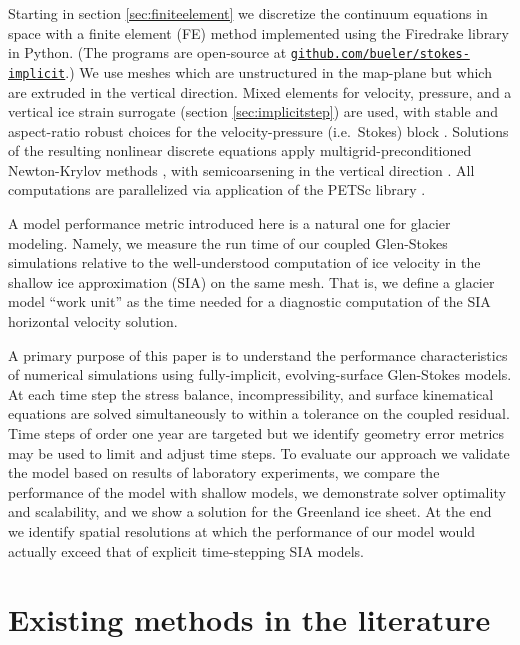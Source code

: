 \documentclass[letterpaper,final,12pt,reqno]{amsart}
\begin{document}
Starting in section \ref{sec:finiteelement} we discretize the continuum equations in space with a finite element (FE) method \cite{Elmanetal2014} implemented using the Firedrake library \cite{Rathgeberetal2016} in Python.  (The programs are open-source at \href{https://github.com/bueler/stokes-implicit}{\texttt{github.com/bueler/stokes-implicit}}.)  We use meshes which are unstructured in the map-plane but which are extruded \cite{Bercea2016,Gibsonetal2019,McRaeetal2016} in the vertical direction.  Mixed elements for velocity, pressure, and a vertical ice strain surrogate (section \ref{sec:implicitstep}) are used, with stable and aspect-ratio robust choices for the velocity-pressure (i.e.~Stokes) block \cite{Elmanetal2014}.  Solutions of the resulting nonlinear discrete equations apply multigrid-preconditioned Newton-Krylov methods \cite{Bueler2021}, with semicoarsening in the vertical direction \cite{Tuminaroetal2016}.  All computations are parallelized via application of the PETSc library \cite{Balayetal2020}.

A model performance metric introduced here is a natural one for glacier modeling.  Namely, we measure the run time of our coupled Glen-Stokes simulations relative to the well-understood computation of ice velocity in the shallow ice approximation (SIA) \cite{Fowler1997} on the same mesh.  That is, we define a glacier model ``work unit'' as the time needed for a diagnostic computation of the SIA horizontal velocity solution.

A primary purpose of this paper is to understand the performance characteristics of numerical simulations using fully-implicit, evolving-surface Glen-Stokes models.  At each time step the stress balance, incompressibility, and surface kinematical equations are solved simultaneously to within a tolerance on the coupled residual.  Time steps of order one year are targeted but we identify geometry error metrics may be used to limit and adjust time steps.  To evaluate our approach we validate the model based on results of laboratory experiments, we compare the performance of the model with shallow models, we demonstrate solver optimality and scalability, and we show a solution for the Greenland ice sheet.  At the end we identify spatial resolutions at which the performance of our model would actually exceed that of explicit time-stepping SIA models.


\section{Existing methods in the literature}  \label{sec:literature}
\end{document}

